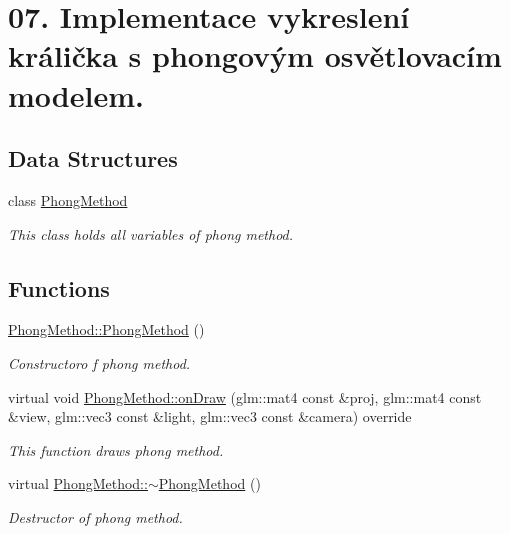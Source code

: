 \hypertarget{group__cpu__side}{}\section{07. Implementace vykreslení králička s phongovým osvětlovacím modelem.}
\label{group__cpu__side}
\subsection*{Data Structures}
\begin{DoxyCompactItemize}
\item 
class \hyperlink{classPhongMethod}{Phong\+Method}
\begin{DoxyCompactList}\small\item\em This class holds all variables of phong method. \end{DoxyCompactList}\end{DoxyCompactItemize}
\subsection*{Functions}
\begin{DoxyCompactItemize}
\item 
\hyperlink{group__cpu__side_ga609f942b12f18a74313937d4aa071c0b}{Phong\+Method\+::\+Phong\+Method} ()
\begin{DoxyCompactList}\small\item\em Constructoro f phong method. \end{DoxyCompactList}\item 
virtual void \hyperlink{group__cpu__side_ga100e32901442800e1c155b5ce089f7c5}{Phong\+Method\+::on\+Draw} (glm\+::mat4 const \&proj, glm\+::mat4 const \&view, glm\+::vec3 const \&light, glm\+::vec3 const \&camera) override
\begin{DoxyCompactList}\small\item\em This function draws phong method. \end{DoxyCompactList}\item 
virtual \hyperlink{group__cpu__side_ga64fbf177f01aca9027d510611a2dad73}{Phong\+Method\+::$\sim$\+Phong\+Method} ()
\begin{DoxyCompactList}\small\item\em Destructor of phong method. \end{DoxyCompactList}\end{DoxyCompactItemize}


